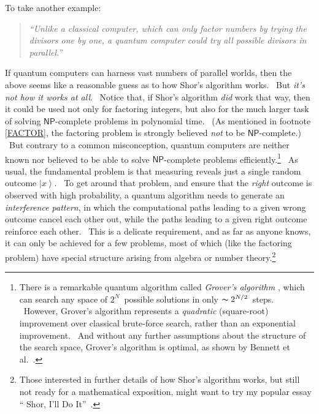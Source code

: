 \documentclass[11pt,onecolumn]{article}%
\begin{document}
To take another example:

\begin{quotation}
\noindent\textit{\textquotedblleft Unlike a classical computer, which can only
factor numbers by trying the divisors one by one, a quantum computer could try
all possible divisors in parallel.\textquotedblright}
\end{quotation}

If quantum computers can harness vast numbers of parallel worlds, then the
above seems like a reasonable guess as to how Shor's algorithm works. \ But
\textit{it's not how it works at all}. \ Notice that, if Shor's algorithm
\textit{did} work that way, then it could be used not only for factoring
integers, but also for the much larger task of solving $\mathsf{NP}$-complete
problems in polynomial time. \ (As mentioned in footnote \ref{FACTOR}, the
factoring problem is strongly believed \textit{not} to be $\mathsf{NP}%
$-complete.) \ But contrary to a common misconception, quantum computers are
neither known nor believed to be able to solve $\mathsf{NP}$-complete problems
efficiently.\footnote{There is a remarkable quantum algorithm called
\textit{Grover's algorithm} \cite{grover}, which can search any space of
$2^{N}$\ possible solutions in only $\thicksim2^{N/2}$\ steps. \ However,
Grover's algorithm represents a \textit{quadratic} (square-root) improvement
over classical brute-force search, rather than an exponential improvement.
\ And without any further assumptions about the structure of the search space,
Grover's algorithm is optimal, as shown by Bennett et al.\ \cite{bbbv}.} \ As
usual, the fundamental problem is that measuring reveals just a single random
outcome $\left\vert x\right\rangle $. \ To get around that problem, and ensure
that the \textit{right} outcome is observed with high probability, a quantum
algorithm needs to generate an \textit{interference pattern}, in which the
computational paths leading to a given wrong outcome cancel each other out,
while the paths leading to a given right outcome reinforce each other. \ This
is a delicate requirement, and as far as anyone knows, it can only be achieved
for a few problems, most of which (like the factoring problem) have special
structure arising from algebra or number theory.\footnote{Those interested in
further details of how Shor's algorithm works, but still not ready for a
mathematical exposition, might want to try my popular essay \textquotedblleft
Shor, I'll Do It\textquotedblright\ \cite{aar:shor}.}
\end{document}
